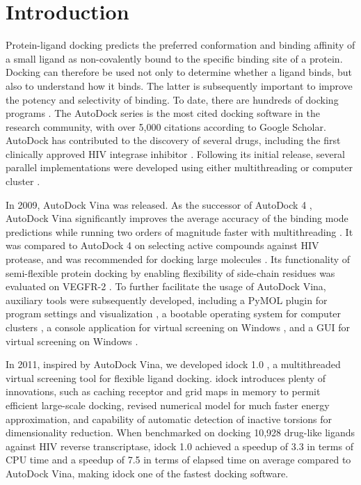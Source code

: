 \documentclass[10pt]{article}
\begin{document}

\section*{Introduction}
Protein-ligand docking predicts the preferred conformation and binding affinity of a small ligand as non-covalently bound to the specific binding site of a protein. Docking can therefore be used not only to determine whether a ligand binds, but also to understand how it binds. The latter is subsequently important to improve the potency and selectivity of binding. To date, there are hundreds of docking programs \cite{493,922}. The AutoDock series \cite{597,596,595} is the most cited docking software in the research community, with over 5,000 citations according to Google Scholar. AutoDock has contributed to the discovery of several drugs, including the first clinically approved HIV integrase inhibitor \cite{1169}. Following its initial release, several parallel implementations were developed using either multithreading or computer cluster \cite{115,560,782}.

In 2009, AutoDock Vina \cite{595} was released. As the successor of AutoDock 4 \cite{596}, AutoDock Vina significantly improves the average accuracy of the binding mode predictions while running two orders of magnitude faster with multithreading \cite{595}. It was compared to AutoDock 4 on selecting active compounds against HIV protease, and was recommended for docking large molecules \cite{556}. Its functionality of semi-flexible protein docking by enabling flexibility of side-chain residues was evaluated on VEGFR-2 \cite{1084}. To further facilitate the usage of AutoDock Vina, auxiliary tools were subsequently developed, including a PyMOL plugin for program settings and visualization \cite{609}, a bootable operating system for computer clusters \cite{773}, a console application for virtual screening on Windows \cite{1268}, and a GUI for virtual screening on Windows \cite{1250}.

In 2011, inspired by AutoDock Vina, we developed idock 1.0 \cite{1153}, a multithreaded virtual screening tool for flexible ligand docking. idock introduces plenty of innovations, such as caching receptor and grid maps in memory to permit efficient large-scale docking, revised numerical model for much faster energy approximation, and capability of automatic detection of inactive torsions for dimensionality reduction. When benchmarked on docking 10,928 drug-like ligands against HIV reverse transcriptase, idock 1.0 achieved a speedup of 3.3 in terms of CPU time and a speedup of 7.5 in terms of elapsed time on average compared to AutoDock Vina, making idock one of the fastest docking software.
\end{document}
